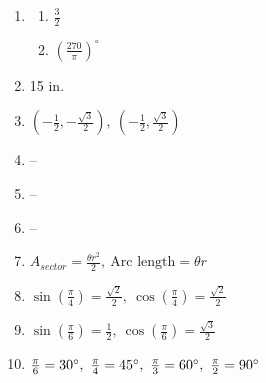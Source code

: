 \documentclass{article}
\begin{document}
\begin{enumerate}
\begin{enumerate}
	\item $\pi r$
	
	\item $r$
	
	\end{enumerate}
	
\item

	\begin{enumerate}
	
	\item $\frac{3}{2}$
	
	\item $\left( \frac{270}{\pi} \right)^ \circ$
	
	\end{enumerate}
	
\item 15 in.

\item $\left( -\frac{1}{2}, -\frac{\sqrt{3}}{2} \right), \ \left( -\frac{1}{2}, \frac{\sqrt{3}}{2} \right)$

\item --

\item --

\item --

\item $A_{sector} = \frac{\theta r^2}{2}, \ \text{Arc length} = \theta r$

\item $\sin \left( \frac{\pi}{4} \right) = \frac{\sqrt{2}}{2}, \ \cos \left( \frac{\pi}{4} \right)  = \frac{\sqrt{2}}{2}$

\item $\sin \left( \frac{\pi}{6} \right) = \frac{1}{2}, \ \cos \left( \frac{\pi}{6} \right) = \frac{\sqrt{3}}{2}$

\item $\frac{\pi}{6} = 30 \degree, \ \frac{\pi}{4} = 45 \degree,  \ \frac{\pi}{3} = 60 \degree, \ \frac{\pi}{2} = 90 \degree$

\end{enumerate}
\end{document}
